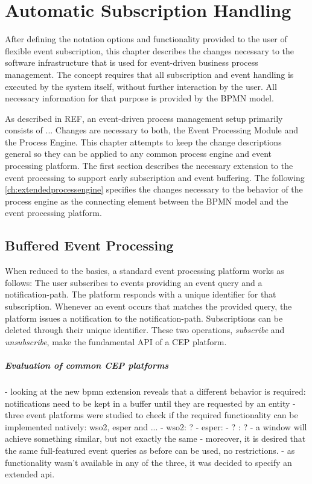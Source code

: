 \chapter{Automatic Subscription Handling}\label{ch:automaticsubscription}

After defining the notation options and functionality provided to the user of flexible event subscription, this chapter describes the changes necessary to the software infrastructure that is used for event-driven business process management.
The concept requires that all subscription and event handling is executed by the system itself, without further interaction by the user.
All necessary information for that purpose is provided by the BPMN model.

As described in REF, an event-driven process management setup primarily consists of ...
Changes are necessary to both, the Event Processing Module and the Process Engine. This chapter attempts to keep the change descriptions general so they can be applied to any common process engine and event processing platform.
The first section describes the necessary extension to the event processing to support early subscription and event buffering.
The following \autoref{ch:extendedprocessengine} specifies the changes necessary to the behavior of the process engine as the connecting element between the BPMN model and the event processing platform.


\section{Buffered Event Processing}\label{ch:bufferedcep}
When reduced to the basics, a standard event processing platform works as follows: The user subscribes to events providing an event query and a notification-path. The platform responds with a unique identifier for that subscription.
Whenever an event occurs that matches the provided query, the platform issues a notification to the notification-path. Subscriptions can be deleted through their unique identifier.
These two operations, \textit{subscribe} and \textit{unsubscribe}, make the fundamental API of a CEP platform.


\paragraph{Evaluation of common CEP platforms}
- looking at the new bpmn extension reveals that a different behavior is required: notifications need to be kept in a buffer until they are requested by an entity
- three event platforms were studied to check if the required functionality can be implemented natively: wso2, esper and ...
- wso2: ?
- esper: 
- ? : ?
- a window will achieve something similar, but not exactly the same
- moreover, it is desired that the same full-featured event queries as before can be used, no restrictions. 
- as functionality wasn't available in any of the three, it was decided to specify an extended api.

